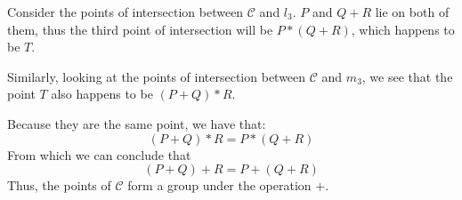 \vspace{1ex}

\noindent
Consider the points of intersection between $\mathcal{C}$ and $l_3$.
$P$ and $Q+R$ lie on both of them, thus the third point of intersection will be $P*(Q+R)$, which happens to be $T$.

\vspace{1ex}

Similarly, looking at the points of intersection between $\mathcal{C}$ and $m_3$, we see that the point $T$ also happens to be $(P+Q)*R$.

\vspace{1ex}

\noindent
Because they are the same point, we have that:
\[(P+Q)*R = P*(Q+R)\]
From which we can conclude that
\[(P+Q)+R = P+(Q+R)\]
Thus, the points of $\mathcal{C}$ form a group under the operation $+$.
